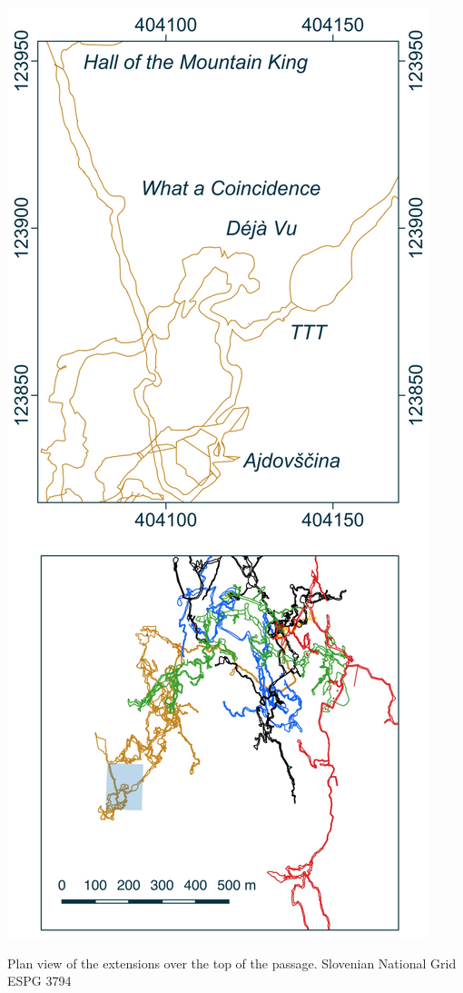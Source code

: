 \begin{marginfigure}
\checkoddpage \ifoddpage \forcerectofloat \else \forceversofloat \fi
\centering
 \includegraphics[width=\linewidth]{images/little_insets/djvu_inset.pdf}
 \caption*{Plan view of the \protect{} extensions over the top of the \protect{} passage. Slovenian National Grid ESPG 3794}
 \label{Déjà Vu inset}
\end{marginfigure}

